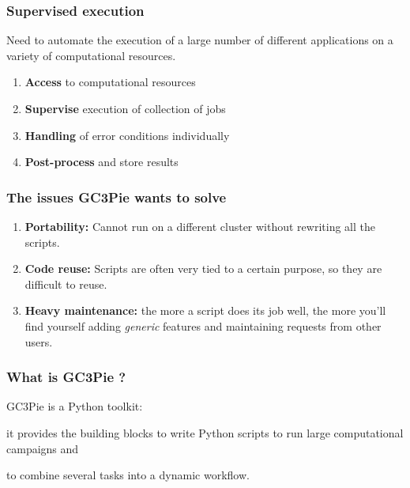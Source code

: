 \documentclass[english,serif,mathserif,xcolor=pdftex,dvipsnames,table]{beamer}
\begin{document}
\begin{frame}
  \frametitle{Supervised execution}
  \begin{block}{}
    Need to automate the execution of a large number of different
    applications on a variety of computational resources.
  \end{block}

  \begin{enumerate}
  \item{\textbf{Access}} to computational resources
  \item{\textbf{Supervise}} execution of collection of jobs
  \item{\textbf{Handling}} of error conditions individually
  \item{\textbf{Post-process}} and store results
  \end{enumerate}
\end{frame}


\begin{frame}
  \frametitle{The issues GC3Pie wants to solve}
  \begin{enumerate}
  \item \textbf{Portability:} Cannot run on a different cluster without
    rewriting all the scripts.
  \item \textbf{Code reuse:} Scripts are often very tied to a certain purpose, so
    they are difficult to reuse.
  \item \textbf{Heavy maintenance:} the more a script does its job well, the more
    you'll find yourself adding \emph{generic} features and maintaining
    requests from other users.
  \end{enumerate}
\end{frame}


\begin{frame}
\frametitle{What is GC3Pie ?}
  \begin{block}{}
    GC3Pie is a {\color{Blue} Python} toolkit:
  \end{block}

  \begin{block}{}
    it provides the building blocks to write Python scripts to run large {\color{Blue} computational campaigns} and
  \end{block}

  \begin{block}{}
    to {\color{Blue} combine} several tasks into a dynamic
    {\color{Blue} workflow}.
  \end{block}
\end{frame}
\end{document}
